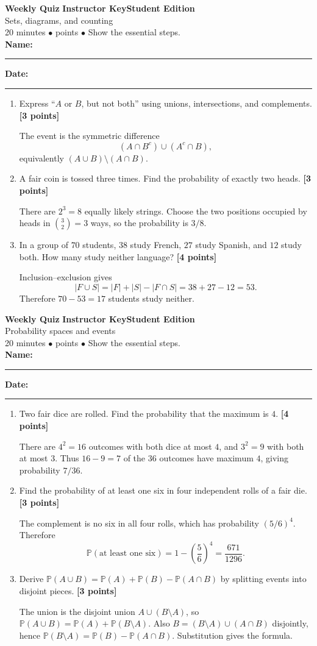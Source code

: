 \documentclass[11pt]{article}
\newcounter{quiznum}
\newcommand{\Prob}{\mathbb P}
\newcommand{\edition}{\ifanswers Instructor Key\else Student Edition\fi}
\newcommand{\points}[1]{\hfill{\small\color{rose}\textbf{[#1 points]}}}
\newcommand{\quizheading}[1]{%
  \clearpage\stepcounter{quiznum}%
  \begin{tcolorbox}[
    enhanced,colback=paper,colframe=indigo,boxrule=1.1pt,arc=2mm,
    left=4mm,right=4mm,top=2.5mm,bottom=2.5mm,
    borderline west={4pt}{0pt}{violet}]
    {\Large\bfseries\color{indigo}Weekly Quiz \thequiznum}\hfill
    {\bfseries\color{violet}\edition}\\[-1pt]
    {\large\color{ink}#1}\\[2pt]
    {\small\color{muted}20 minutes \quad $\bullet$ \quad 10 points \quad $\bullet$ \quad Show the essential steps.}
    \ifanswers\else
      \\[5pt]\textbf{Name:}\ \rule{0.48\linewidth}{0.4pt}\hfill
      \textbf{Date:}\ \rule{0.20\linewidth}{0.4pt}
    \fi
  \end{tcolorbox}
}
\begin{document}
\quizheading{Sets, diagrams, and counting}
\begin{enumerate}
  \item Express ``$A$ or $B$, but not both'' using unions, intersections, and
  complements. \points{3}
  \begin{solution}[1.05in]
    The event is the symmetric difference
    \[
       (A\cap B^c)\cup(A^c\cap B),
    \]
    equivalently $(A\cup B)\setminus(A\cap B)$.
  \end{solution}

  \item A fair coin is tossed three times. Find the probability of exactly two
  heads. \points{3}
  \begin{solution}[1.2in]
    There are $2^3=8$ equally likely strings. Choose the two positions occupied by
    heads in $\binom32=3$ ways, so the probability is $3/8$.
  \end{solution}

  \item In a group of $70$ students, $38$ study French, $27$ study Spanish, and
  $12$ study both. How many study neither language? \points{4}
  \begin{solution}[1.45in]
    Inclusion--exclusion gives
    \[
      |F\cup S|=|F|+|S|-|F\cap S|=38+27-12=53.
    \]
    Therefore $70-53=17$ students study neither.
  \end{solution}
\end{enumerate}

\quizheading{Probability spaces and events}
\begin{enumerate}
  \item Two fair dice are rolled. Find the probability that the maximum is $4$.
  \points{4}
  \begin{solution}[1.4in]
    There are $4^2=16$ outcomes with both dice at most $4$, and $3^2=9$ with both
    at most $3$. Thus $16-9=7$ of the $36$ outcomes have maximum $4$, giving
    probability $7/36$.
  \end{solution}

  \item Find the probability of at least one six in four independent rolls of a
  fair die. \points{3}
  \begin{solution}[1.15in]
    The complement is no six in all four rolls, which has probability $(5/6)^4$.
    Therefore
    \[
       \Prob(\text{at least one six})=1-\left(\frac56\right)^4=\frac{671}{1296}.
    \]
  \end{solution}

  \item Derive $\Prob(A\cup B)=\Prob(A)+\Prob(B)-\Prob(A\cap B)$ by splitting
  events into disjoint pieces. \points{3}
  \begin{solution}[1.35in]
    The union is the disjoint union $A\cup(B\setminus A)$, so
    $\Prob(A\cup B)=\Prob(A)+\Prob(B\setminus A)$. Also
    $B=(B\setminus A)\cup(A\cap B)$ disjointly, hence
    $\Prob(B\setminus A)=\Prob(B)-\Prob(A\cap B)$. Substitution gives the formula.
  \end{solution}
\end{enumerate}
\end{document}
